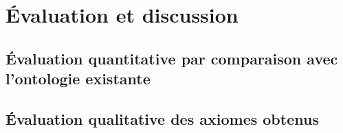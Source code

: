 \iffalse {
\subsubsection{Détails pratiques}

Axiomes vus comme des vecteurs bo   oléens. Le tout est vu comme une matrice booléenne, opérations rapides sur les lignes et les columns

Expliquer la traduction matricielle de $\cov, \spe, \xscore \ldots$


\subsection{Algorithme général}
\subsubsection{Vue d'ensemble}

Extraction de taxonomie à partir des axiomes

Choix des seuils

Discussion sur les paramètres

\subsubsection{Diminution du seuil}


\subsubsection{Phase finale}

Phase finale : ajout des classes manquantes (si disponible), restriction des patterns}
\fi 

\section{Évaluation et discussion}

\subsection{Évaluation quantitative par comparaison avec l'ontologie existante}


\subsection{Évaluation qualitative des axiomes obtenus}

%
%
%
%
%